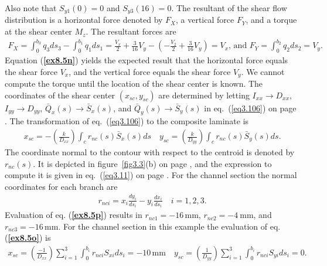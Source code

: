 \documentclass{AeroStructure-ERJohnson}
\begin{document}
\begin{example*}
\noindent Also note that $S_{y 1}(0)=0$ and $S_{y
3}(16)=0$. The resultant of the shear flow distribution is a
horizontal force denoted by $F_{X}$, a vertical force $F_{Y}$, and
a torque at the shear center $M_{z}$. The resultant forces are
\begin{align}\tag{n}\label{ex8.5n}
F_{X}=\int_{0}^{b_{3}}\! q_{3} d s_{3}-\int_{0}^{b_{1}}\! q_{1} d
s_{1}=\frac{V_{x}}{2}+\frac{3}{16}
V_{y}-\left(-\frac{V_{2}}{2}+\frac{3}{16} V_{y}\right)=V_{x}\mbox{, and }F_{Y}=\int_{0}^{b_{2}}\! q_{2} d s_{2}=V_{y}.
\end{align}
Equation (\textbf{\ref{ex8.5n}}) yields the expected result that the horizontal force
equals the shear force $V_{x}$, and the vertical force equals the
shear force $V_{y}$. We cannot compute the torque until the
location of the shear center is known. The coordinates of the
shear center $\left(x_{s c}, y_{s c}\right)$ are determined by
letting $I_{x x} \rightarrow D_{x x}$, $I_{y y} \rightarrow D_{y
y}$, $\bar{Q}_{x}(s) \rightarrow \bar{S}_{x}(s)$, and
$\bar{Q}_{y}(s) \rightarrow \bar{S}_{y}(s)$ in eq.~(\ref{eq3.106})
on page \pageref{eq3.106}. The transformation of eq.~(\ref{eq3.106}) to the
composite laminate is
\begin{align}
x_{s c}=-\left(\frac{k}{D_{x x}}\right) \int_{c} r_{n c}(s)
\bar{S}_{x}(s) d s \quad y_{s c}=\left(\frac{k}{D_{y y}}\right)
\int_{c} r_{n c}(s) \bar{S}_{y}(s) d s.\tag{o}\label{ex8.5o}
\end{align}
The coordinate normal
to the contour with respect to the centroid is denoted by $r_{n
c}(s)$. It is depicted in figure~\ref{fig3.3}(b) on page \pageref{fig3.3}, and the
expression to compute it is given in eq.~(\ref{eq3.11}) on page
\pageref{eq3.11}. For the channel section the normal coordinates for each branch
are
\begin{align}
r_{n c i}=x_{i} \frac{d y_{i}}{d s_{i}}-y_{i} \frac{d
x_{i}}{d s_{i}} \quad i=1,2,3.\tag{p}\label{ex8.5p}
\end{align}
Evaluation of eq. (\textbf{\ref{ex8.5p}})
results in $r_{n c 1}=-16\,\mathrm{mm}$, $r_{n c 2}=-4
\mathrm{~mm}$, and $r_{n c 3}=-16\,\mathrm{mm}$. For the channel
section in this example the evaluation of eq. (\textbf{\ref{ex8.5o}}) is
\begin{align}
x_{s c}=\left(\frac{-1}{D_{x x}}\right) \sum_{i=1}^{3}
\int^{b_i}_{0}r_{\textit{nci}} S_{x i} d s_{i}=-10\,\mathrm{mm} \quad
y_{sc}=\left(\frac{1}{D_{y y}}\right) \sum_{i=1}^{3} \int^{b_i}_{0}r_{\textit{nci}}S_{yi} d s_{i}=0.
\tag{q}\label{ex8.5q}
\end{align}

\end{example*}
\end{document}
